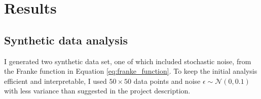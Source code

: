 \section{Results}\label{sec:results}
\subsection{Synthetic data analysis}\label{ssec:synthetic_data}
I generated two synthetic data set, one of which included stochastic noise, from the Franke function in Equation \eqref{eq:franke_function}. To keep the initial analysis efficient and interpretable, I used $50 \times 50$ data points and noise $\epsilon \sim \mathcal{N}(0, 0.1)$ with less variance than suggested in the project description. 

